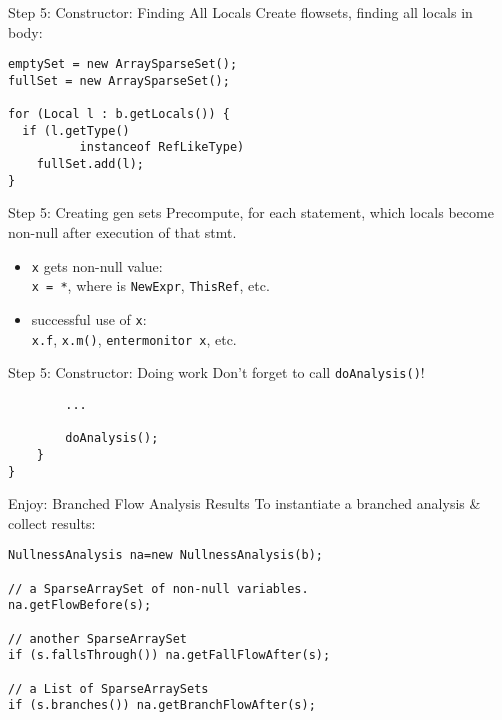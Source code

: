 \begin{slide}{Step 5: Constructor: Finding All Locals}
Create flowsets, finding all locals in body:

\begin{verbatim}
emptySet = new ArraySparseSet();
fullSet = new ArraySparseSet();

for (Local l : b.getLocals()) {
  if (l.getType() 
          instanceof RefLikeType)
    fullSet.add(l);
}
\end{verbatim}
\end{slide}

\begin{slide}{Step 5: Creating gen sets}
Precompute, for each statement, which locals become non-null after execution of that stmt.

\begin{itemize}
\item {\tt x} gets non-null value:\\
{\tt x = *}, where {\tt *} is {\tt NewExpr}, {\tt ThisRef}, etc.
\item successful use of {\tt x}:\\
{\tt x.f}, {\tt x.m()}, {\tt entermonitor x}, etc.
\end{itemize}
\end{slide}

\begin{slide}{Step 5: Constructor: Doing work}
\vspace*{-0.1in}
Don't forget to call {\tt doAnalysis()}!

\vspace*{0.05in}
\begin{verbatim}
        ...

        doAnalysis();
    }
}
\end{verbatim}
\end{slide}

\begin{slide}{Enjoy: Branched Flow Analysis Results}
\vspace*{-0.2in}
To instantiate a branched analysis \& collect results:
{\small
\begin{verbatim}
NullnessAnalysis na=new NullnessAnalysis(b);

// a SparseArraySet of non-null variables.
na.getFlowBefore(s);  

// another SparseArraySet
if (s.fallsThrough()) na.getFallFlowAfter(s);

// a List of SparseArraySets
if (s.branches()) na.getBranchFlowAfter(s);
\end{verbatim}}
\end{slide}



